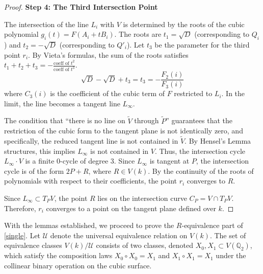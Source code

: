 \documentclass[11pt]{article}
\theoremstyle{definition}
\begin{document}
\begin{proof}
\vspace{0.5em}
\noindent\textbf{Step 4: The Third Intersection Point}

    The intersection of the line $L_i$ with $V$ is determined by the roots of the cubic polynomial $g_i(t) = F(A_i + t B_i)$. The roots are $t_1 = \sqrt{D}$ (corresponding to $Q_i$) and $t_2 = -\sqrt{D}$ (corresponding to $Q'_i$). Let $t_3$ be the parameter for the third point $r_i$.
    By Vieta's formulas, the sum of the roots satisfies $t_1 + t_2 + t_3 = - \frac{\text{coeff of } t^2}{\text{coeff of } t^3}$.
    \[ \sqrt{D} - \sqrt{D} + t_3 = t_3 = - \frac{F_2(i)}{F_3(i)} \]
    where $C_3(i)$ is the coefficient of the cubic term of $F$ restricted to $L_i$. In the limit, the line becomes a tangent line $L_\infty$.
    
    The condition that ``there is no line on $\tilde{V}$ through $\tilde{P}$'' guarantees that the restriction of the cubic form to the tangent plane is not identically zero, and specifically, the reduced tangent line is not contained in $\tilde{V}$. By Hensel's Lemma structures, this implies $L_\infty$ is not contained in $V$. Thus, the intersection cycle $L_\infty \cdot V$ is a finite 0-cycle of degree 3.
    Since $L_\infty$ is tangent at $P$, the intersection cycle is of the form $2P + R$, where $R \in V(k)$.
    By the continuity of the roots of polynomials with respect to their coefficients, the point $r_i$ converges to $R$.
    
    Since $L_\infty \subset T_P V$, the point $R$ lies on the intersection curve $C_P = V \cap T_P V$.
    Therefore, $r_i$ converges to a point on the tangent plane defined over $k$.
\end{proof}

With the lemmas established, we proceed to prove the $R$-equivalence part of \ref{single}.
Let $\mathcal{U}$ denote the universal equivalence relation on $V(k)$. The set of equivalence classes $V(k)/\mathcal{U}$ consists of two classes, denoted $X_0, X_1 \subset V(\mathbb{Q}_2)$, which satisfy the composition laws $X_0 \circ X_0 = X_1$ and $X_1 \circ X_1 = X_1$ under the collinear binary operation on the cubic surface.
\end{document}
